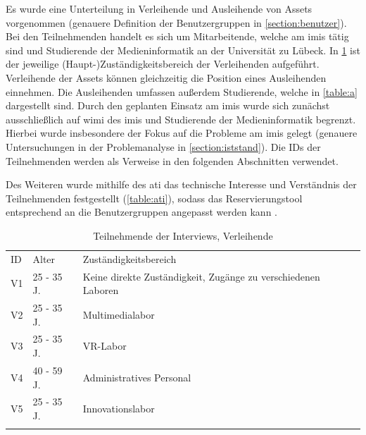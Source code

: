 Es wurde eine Unterteilung in Verleihende und Ausleihende von Assets vorgenommen (genauere
Definition der Benutzergruppen in \ref{section:benutzer}). Bei den Teilnehmenden handelt es sich um
Mitarbeitende, welche am \ac{imis} tätig sind und Studierende der Medieninformatik an der
Universität zu Lübeck. In \ref{table:v} ist der jeweilige (Haupt-)Zuständigkeitsbereich der
Verleihenden aufgeführt. Verleihende der Assets können gleichzeitig die Position eines Ausleihenden
einnehmen. Die Ausleihenden umfassen außerdem Studierende, welche in \ref{table:a} dargestellt sind.
Durch den geplanten Einsatz am \ac{imis} wurde sich zunächst ausschließlich auf \ac{wimi} des
\ac{imis} und Studierende der Medieninformatik begrenzt. Hierbei wurde insbesondere der Fokus auf
die Probleme am \ac*{imis} gelegt (genauere Untersuchungen in der Problemanalyse in
\ref{section:iststand}). Die IDs der Teilnehmenden werden als Verweise in den folgenden Abschnitten
verwendet.

Des Weiteren wurde mithilfe des \ac{ati} das technische Interesse und
Verständnis der Teilnehmenden festgestellt (\ref{table:ati}), sodass das
Reservierungstool entsprechend an die Benutzergruppen angepasst werden kann
\cite{attig_assessing_2017}.

\begin{table}[h]
        \centering
        \caption{Teilnehmende der Interviews, Verleihende}
        \begin{tabular}{lll}
                \arrayrulecolor{maincolor}\hline
                \sffamily\color{maincolor}ID & \sffamily\color{maincolor}Alter &
                \sffamily\color{maincolor}Zuständigkeitsbereich                                   \\
                \arrayrulecolor{maincolor}\hline
                V1                           & 25 - 35 J.                      & Keine direkte
                Zuständigkeit, Zugänge zu verschiedenen Laboren                                   \\
                V2                           & 25 - 35 J.                      & Multimedialabor
                \\
                V3                           & 25 - 35 J.                      & VR-Labor
                \\
                V4                           & 40 - 59 J.                      & Administratives
                Personal                                                                          \\
                V5                           & 25 - 35 J.                      & Innovationslabor
                \\
                \arrayrulecolor{maincolor}\hline
        \end{tabular}
        \label{table:v}
\end{table}

